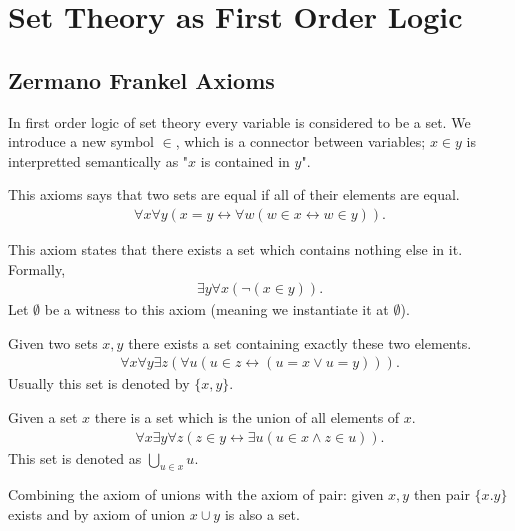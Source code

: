\section{Set Theory as First Order Logic}
\subsection{Zermano Frankel Axioms}
In first order logic of set theory every variable is considered to be a set. We introduce a new symbol $\in$, which is a connector between variables; $x\in y$ is interpretted semantically as "$x$ is contained in $y$".
\begin{axiom}[Extensionality]
  This axioms says that two sets are equal if all of their elements are equal.
  \begin{align*}
    \forall x \forall y (x = y \leftrightarrow \forall w(w\in x \leftrightarrow w\in y)).
  \end{align*}
\end{axiom}
\begin{axiom}
  This axiom states that there exists a set which contains nothing else in it. Formally,
  \begin{align*}
    \exists y\forall x (\lnot (x\in y)).
  \end{align*}
  Let $\emptyset$ be a witness to this axiom (meaning we instantiate it at $\emptyset$).
\end{axiom}
\begin{axiom}
  Given two sets $x,y$ there exists a set containing exactly these two elements.
  \begin{align*}
    \forall x\forall y\exists z(\forall u (u\in z \leftrightarrow (u = x \lor u = y))).
  \end{align*}
  Usually this set is denoted by $\{x,y\}$.
\end{axiom}
\begin{axiom}
  Given a set $x$ there is a set which is the union of all elements of $x$.
  \begin{align*}
    \forall x \exists y \forall z (z \in y \leftrightarrow \exists u (u\in x \land z\in u)).
  \end{align*}
  This set is denoted as $\bigcup_{u\in x} u$.
\end{axiom}
\begin{remark}
  Combining the axiom of unions with the axiom of pair: given $x,y$ then pair $\{x.y\}$ exists and by axiom of union $x\cup y$ is also a set.
\end{remark}
